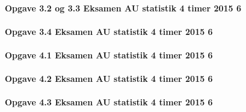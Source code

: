 \documentclass[]{book}
\let\oldparagraph\paragraph
\renewcommand{\paragraph}[1]{\oldparagraph{#1}\mbox{}}
\begin{document}
\hypertarget{opgave-3.2-og-3.3-eksamen-au-statistik-4-timer-2015-6}{%
\paragraph{Opgave 3.2 og 3.3 Eksamen AU statistik 4 timer 2015 6}\label{opgave-3.2-og-3.3-eksamen-au-statistik-4-timer-2015-6}}

\hypertarget{opgave-3.4-eksamen-au-statistik-4-timer-2015-6}{%
\paragraph{Opgave 3.4 Eksamen AU statistik 4 timer 2015 6}\label{opgave-3.4-eksamen-au-statistik-4-timer-2015-6}}

\hypertarget{opgave-4.1-eksamen-au-statistik-4-timer-2015-6}{%
\paragraph{Opgave 4.1 Eksamen AU statistik 4 timer 2015 6}\label{opgave-4.1-eksamen-au-statistik-4-timer-2015-6}}

\hypertarget{opgave-4.2-eksamen-au-statistik-4-timer-2015-6}{%
\paragraph{Opgave 4.2 Eksamen AU statistik 4 timer 2015 6}\label{opgave-4.2-eksamen-au-statistik-4-timer-2015-6}}

\hypertarget{opgave-4.3-eksamen-au-statistik-4-timer-2015-6}{%
\paragraph{Opgave 4.3 Eksamen AU statistik 4 timer 2015 6}\label{opgave-4.3-eksamen-au-statistik-4-timer-2015-6}}


\end{document}
